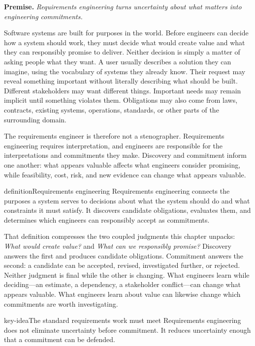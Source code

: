 \textbf{Premise.} \emph{Requirements engineering turns uncertainty about what matters into engineering commitments.}

Software systems are built for purposes in the world. Before engineers can decide how a system
should work, they must decide what would create value and what they can responsibly promise to
deliver. Neither decision is simply a matter of asking people what they want. A user usually describes a solution
they can imagine, using the vocabulary of systems they already know. Their request may reveal
something important without literally describing what should be built. Different stakeholders may
want different things. Important needs may remain implicit until something violates them.
Obligations may also come from laws, contracts, existing systems, operations, standards, or other
parts of the surrounding domain.

The requirements engineer is therefore not a stenographer. Requirements engineering requires
interpretation, and engineers are responsible for the interpretations and commitments they make.
Discovery and commitment inform one another: what appears valuable affects what engineers
consider promising, while feasibility, cost, risk, and new evidence can change what appears
valuable.

\begin{bookbox}{definition}{Requirements engineering} %
Requirements engineering connects the purposes a system serves to decisions about what the system
should do and what constraints it must satisfy. It discovers candidate obligations, evaluates them,
and determines which engineers can responsibly accept as commitments.
\end{bookbox}

That definition compresses the two coupled judgments this chapter unpacks: \emph{What would create value?} and \emph{What can we responsibly promise?}
Discovery answers the first and produces candidate obligations.
Commitment answers the second: a candidate can be accepted, revised, investigated further, or rejected.
Neither judgment is final while the other is changing.
What engineers learn while deciding---an estimate, a dependency, a stakeholder conflict---can change what appears valuable.
What engineers learn about value can likewise change which commitments are worth investigating.

\begin{bookbox}{key-idea}{The standard requirements work must meet} %
Requirements engineering does not eliminate uncertainty before commitment. It reduces uncertainty
enough that a commitment can be defended.
\end{bookbox}

